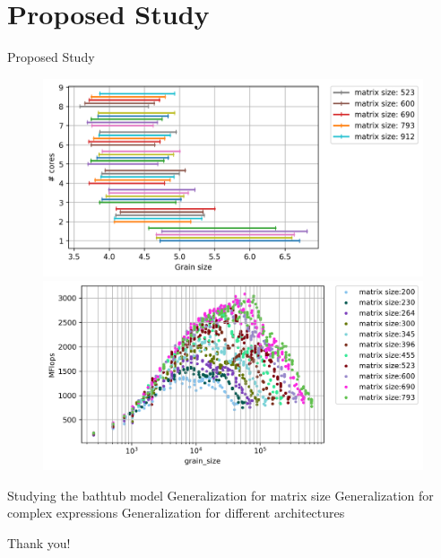 \documentclass[10pt]{beamer}
\begin{document}
\section{Proposed Study}
\begin{frame}{Proposed Study}
\begin{outline}	
	\begin{figure}[H]
		\centering
		\includegraphics[scale=.25]{images/polyfit/fig_523-912_peak_range_all.png}
		\includegraphics[scale=.25]{images/fig11.png}	
		\label{fig20}
	\end{figure} 
	\1Studying the bathtub model
	\1Generalization for matrix size 
	\1Generalization for complex expressions
	\1Generalization for different architectures
\end{outline}
\end{frame}


\begin{frame}[standout]
  Thank you!
\end{frame}
\end{document}
